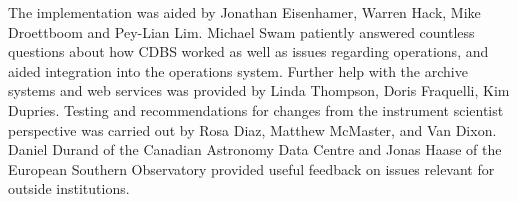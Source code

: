\documentclass[final,authoryear,5p,times,twocolumn]{elsarticle}
\begin{document}
The implementation was aided by Jonathan Eisenhamer, Warren Hack, Mike Droettboom
and Pey-Lian Lim. 
Michael Swam patiently answered countless questions about how CDBS
worked as well as issues regarding operations, and aided integration into the 
operations system. Further help with the archive systems and web services
was provided by Linda Thompson, Doris Fraquelli, Kim Dupries.
Testing and recommendations for changes from the instrument scientist
perspective was carried out by Rosa Diaz, Matthew McMaster, and Van Dixon.
Daniel Durand of the Canadian Astronomy Data Centre and Jonas Haase of the
European Southern Observatory provided useful feedback on issues relevant
for outside institutions.




\end{document}
